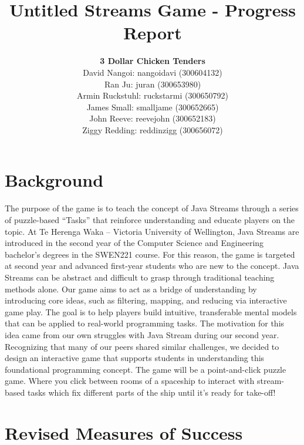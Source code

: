 \documentclass{article}
\title{Untitled Streams Game - Progress Report}
\author{ 
    \textbf{3 Dollar Chicken Tenders}
    \\
    David Nangoi: nangoidavi (300604132) \\ 
    Ran Ju: juran (300653980) \\ 
    Armin Ruckstuhl: ruckstarmi (300650792) \\ 
    James Small: smalljame (300652665) \\ 
    John Reeve: reevejohn (300652183) \\ 
    Ziggy Redding: reddinzigg (300656072) 
}
\date{}
\begin{document}
\maketitle

\section{Background}
The purpose of the game is to teach the concept of Java Streams through a series of puzzle-based “Tasks” that reinforce understanding and educate players on the topic. At Te Herenga Waka – Victoria University of Wellington, Java Streams are introduced in the second year of the Computer Science and Engineering bachelor’s degrees in the SWEN221 course. For this reason, the game is targeted at second year and advanced first-year students who are new to the concept. 
\newline\newline
Java Streams can be abstract and difficult to grasp through traditional teaching methods alone. Our game aims to act as a bridge of understanding by introducing core ideas, such as filtering, mapping, and reducing via interactive game play. The goal is to help players build intuitive, transferable mental models that can be applied to real-world programming tasks. 
\newline\newline
The motivation for this idea came from our own struggles with Java Stream during our second year. Recognizing that many of our peers shared similar challenges, we decided to design an interactive game that supports students in understanding this foundational programming concept. 
\newline\newline
The game will be a point-and-click puzzle game. Where you click between rooms of a spaceship to interact with stream-based tasks which fix different parts of the ship until it’s ready for take-off! 



\section{Revised Measures of Success}
\end{document}
